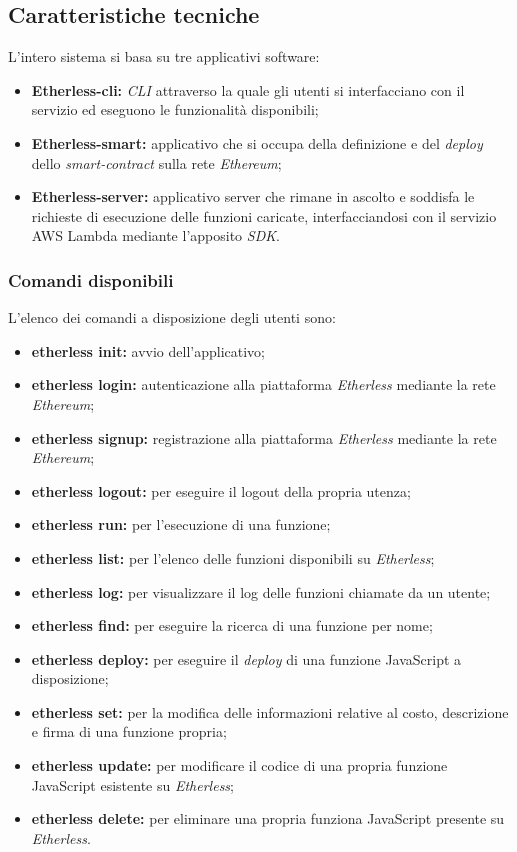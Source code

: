 \subsection{Caratteristiche tecniche}

L'intero sistema si basa su tre applicativi software:
	\begin{itemize}
		\item \textbf{Etherless-cli:} \textit{CLI\glo} attraverso la quale gli utenti si interfacciano con il servizio ed eseguono le funzionalità disponibili;
		\item \textbf{Etherless-smart:} applicativo che si occupa della definizione e del \textit{deploy\glo} dello \textit{smart-contract} sulla rete \textit{Ethereum\glos};
		\item \textbf{Etherless-server:} applicativo server che rimane in ascolto e soddisfa le richieste di esecuzione delle funzioni caricate, interfacciandosi con il servizio AWS Lambda mediante l'apposito \textit{SDK\glos}.
	\end{itemize}

\subsubsection{Comandi disponibili}
L'elenco dei comandi a disposizione degli utenti sono:
\begin{itemize}
	\item \textbf{etherless init:} avvio dell'applicativo;
	\item \textbf{etherless login:} autenticazione alla piattaforma \textit{Etherless} mediante la rete \textit{Ethereum\glos};
	\item \textbf{etherless signup:} registrazione alla piattaforma \textit{Etherless} mediante la rete \textit{Ethereum\glos};
	\item \textbf{etherless logout:} per eseguire il logout della propria utenza;
	\item \textbf{etherless run:} per l'esecuzione di una funzione;
	\item \textbf{etherless list:} per l'elenco delle funzioni disponibili su \textit{Etherless};
	\item \textbf{etherless log:} per visualizzare il log delle funzioni chiamate da un utente;
	\item \textbf{etherless find:} per eseguire la ricerca di una funzione per nome;
	\item \textbf{etherless deploy\glos:} per eseguire il \textit{deploy\glo} di una funzione JavaScript a disposizione;
	\item \textbf{etherless set:} per la modifica delle informazioni relative al costo, descrizione e firma di una funzione propria;
	\item \textbf{etherless update:} per modificare il codice di una propria funzione JavaScript esistente su \textit{Etherless};
	\item \textbf{etherless delete:} per eliminare una propria funziona JavaScript presente su \textit{Etherless}.
\end{itemize}

